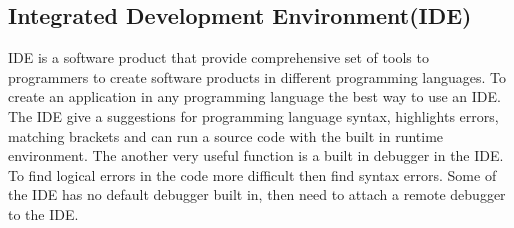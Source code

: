 \documentclass[12pt]{article}
\begin{document}
\subsection{Integrated Development Environment(IDE)}
IDE is a software product that provide comprehensive set of tools to programmers to create software products in different programming languages. 
To create an application in any programming language the best way to use an IDE. The IDE give a suggestions for programming language syntax, highlights errors, matching brackets and can run a source code with the built in runtime environment. The another very useful function is a built in debugger in the IDE. To find logical errors in the code more difficult then find syntax errors. Some of the IDE has no default debugger built in, then need to attach a remote debugger to the IDE.\\
\end{document}
